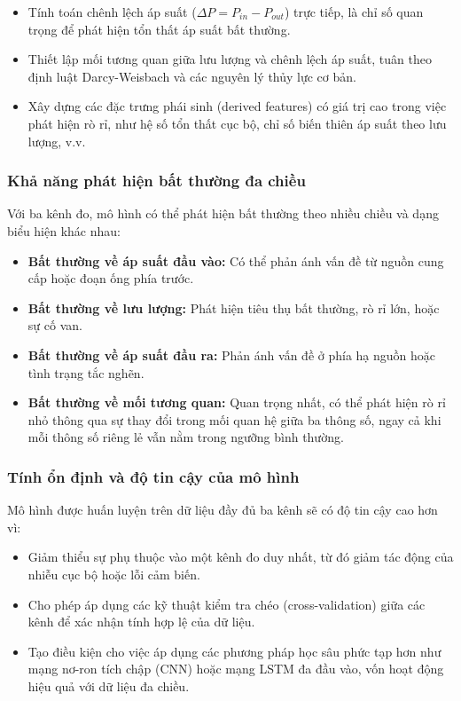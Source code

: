 \begin{itemize}
    \item Tính toán chênh lệch áp suất ($\Delta P = P_{in} - P_{out}$) trực tiếp, là chỉ số quan trọng để phát hiện tổn thất áp suất bất thường.
    \item Thiết lập mối tương quan giữa lưu lượng và chênh lệch áp suất, tuân theo định luật Darcy-Weisbach và các nguyên lý thủy lực cơ bản.
    \item Xây dựng các đặc trưng phái sinh (derived features) có giá trị cao trong việc phát hiện rò rỉ, như hệ số tổn thất cục bộ, chỉ số biến thiên áp suất theo lưu lượng, v.v.
\end{itemize}

\subsubsection{Khả năng phát hiện bất thường đa chiều}
Với ba kênh đo, mô hình có thể phát hiện bất thường theo nhiều chiều và dạng biểu hiện khác nhau:

\begin{itemize}
    \item \textbf{Bất thường về áp suất đầu vào:} Có thể phản ánh vấn đề từ nguồn cung cấp hoặc đoạn ống phía trước.
    \item \textbf{Bất thường về lưu lượng:} Phát hiện tiêu thụ bất thường, rò rỉ lớn, hoặc sự cố van.
    \item \textbf{Bất thường về áp suất đầu ra:} Phản ánh vấn đề ở phía hạ nguồn hoặc tình trạng tắc nghẽn.
    \item \textbf{Bất thường về mối tương quan:} Quan trọng nhất, có thể phát hiện rò rỉ nhỏ thông qua sự thay đổi trong mối quan hệ giữa ba thông số, ngay cả khi mỗi thông số riêng lẻ vẫn nằm trong ngưỡng bình thường.
\end{itemize}

\subsubsection{Tính ổn định và độ tin cậy của mô hình}
Mô hình được huấn luyện trên dữ liệu đầy đủ ba kênh sẽ có độ tin cậy cao hơn vì:

\begin{itemize}
    \item Giảm thiểu sự phụ thuộc vào một kênh đo duy nhất, từ đó giảm tác động của nhiễu cục bộ hoặc lỗi cảm biến.
    \item Cho phép áp dụng các kỹ thuật kiểm tra chéo (cross-validation) giữa các kênh để xác nhận tính hợp lệ của dữ liệu.
    \item Tạo điều kiện cho việc áp dụng các phương pháp học sâu phức tạp hơn như mạng nơ-ron tích chập (CNN) hoặc mạng LSTM đa đầu vào, vốn hoạt động hiệu quả với dữ liệu đa chiều.
\end{itemize}

